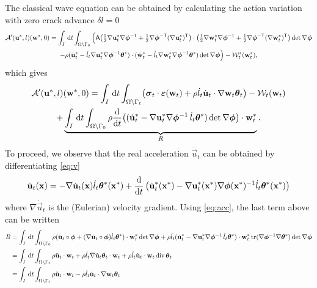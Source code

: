 The classical wave equation can be obtained by calculating the action variation with zero crack advance $\delta l=0$
\begin{multline*}
\mathcal{A}'(\vec{u}^*,l)(\vec{w}^*,0)=\int_I\D{t}\int_\domaini\Big(\tens{A}\bigl({\textstyle\frac{1}{2}}\nabla\vec{u}_t^*\nabla\philt^{-1}+{\textstyle\frac{1}{2}}\nabla\philt^{-\mathsf{T}}(\nabla\vec{u}_t^*)^\mT\bigr)\cdot\bigl({\textstyle\frac{1}{2}}\nabla\vec{w}_t^*\nabla\philt^{-1}+{\textstyle\frac{1}{2}}\nabla\philt^{-\mathsf{T}}(\nabla\vec{w}_t^*)^\mT\bigr)\det\nabla\philt \\
-\rho(\dot{\vec{u}}_t^*-\dot{l}_t\nabla\vec{u}_t^*\nabla\philt^{-1}\vtheta^*)\cdot(\dot{\vec{w}}_t^*-\dot{l}_t\nabla\vec{w}_t^*\nabla\philt^{-1}\vtheta^*)\det\nabla\philt\Big)-\mathcal{W}_t^*(\vec{w}^*_t) ,
\end{multline*}
which gives
\begin{multline} \label{eq:aprime1}
\mathcal{A}'(\vec{u}^*,l)(\vec{w}^*,0)=\int_I\D{t}\int_\domaint\bigl(\sig_t\cdot\eps(\vec{w}_t)+\rho\dot{l}_t\dot{\vec{u}}_t\cdot\nabla\vec{w}_t\vtheta_t \bigr)-\mathcal{W}_t(\vec{w}_t) \\
+\underbrace{\int_I\D{t}\int_\domaini\rho\frac{\md}{\md t}\bigl((\dot{\vec{u}}_t^*-\nabla\vec{u}_t^*\nabla\philt^{-1}\,\dot{l}_t\vtheta^*)\det\nabla\philt\bigr)\cdot\vec{w}_t^*}_R.
\end{multline}
To proceed, we observe that the real acceleration $\ddot{\vec{u}}_t$ can be obtained by differentiating \eqref{eq:v}
\begin{equation} \label{eq:acc}
\ddot{\vec{u}}_t(\vec{x})=-\nabla\dot{\vec{u}}_t(\vec{x})\dot{l}_t\vtheta^*(\vec{x}^*)+\frac{\md}{\md t}\left(\dot{\vec{u}}_t^*(\vec{x}^*)-\nabla\vec{u}_t^*(\vec{x}^*)\nabla\philt(\vec{x}^*)^{-1}\dot{l}_t\vtheta^*(\vec{x}^*)\right)
\end{equation}
where $\nabla\dot{\vec{u}}_t$ is the (Eulerian) velocity gradient. Using \eqref{eq:acc}, the last term above can be written
\begin{equation} \label{eq:aprime2}
\begin{aligned}
R &= \int_I\D{t}\int_\domaini\rho(\ddot{\vec{u}}_t\circ\philt+(\nabla\dot{\vec{u}}_t\circ\philt)\dot{l}_t\vtheta^*)\cdot\vec{w}_t^*\det\nabla\philt+\rho\dot{l}_t(\dot{\vec{u}}_t^*-\nabla\vec{u}_t^*\nabla\philt^{-1}\,\dot{l}_t\vtheta^*)\cdot\vec{w}_t^*\tr(\nabla\philt^{-1}\nabla\vtheta^*)\det\nabla\philt \\
&= \int_I\D{t}\int_\domaint\rho\ddot{\vec{u}}_t\cdot\vec{w}_t+\rho\dot{l}_t\nabla\dot{\vec{u}}_t\vtheta_t\cdot\vec{w}_t+\rho\dot{l}_t\dot{\vec{u}}_t\cdot\vec{w}_t\div\vtheta_t \\
&= \int_I\D{t}\int_\domaint\rho\ddot{\vec{u}}_t\cdot\vec{w}_t-\rho\dot{l}_t\dot{\vec{u}}_t\cdot\nabla\vec{w}_t\vtheta_t
\end{aligned}
\end{equation}
